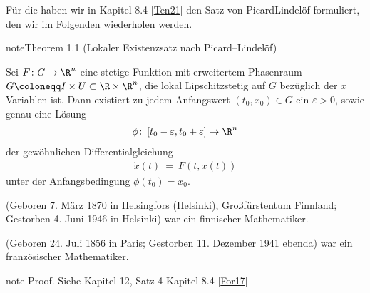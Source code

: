 \documentclass[letterpaper,10pt,english]{jupyterBook}
\begin{document}
\sphinxAtStartPar
Für die  haben wir in Kapitel 8.4 {[}\hyperlink{cite.references:id12}{Ten21}{]} den Satz von Picard\sphinxhyphen{}Lindelöf formuliert, den wir im Folgenden wiederholen werden.
\label{ode/repetition:thm:piclindlokal}
\begin{sphinxadmonition}{note}{Theorem 1.1 (Lokaler Existenzsatz nach Picard–Lindelöf)}



\sphinxAtStartPar
Sei \(F\colon G\to\R^n\) eine stetige Funktion mit erweitertem Phasenraum \(G \coloneqq I \times U \subset \R\times\R^n\), die lokal Lipschitz\sphinxhyphen{}stetig auf \(G\) bezüglich der \(x\)\sphinxhyphen{}Variablen ist.
Dann existiert zu jedem Anfangswert \((t_0,x_0) \in G\) ein \(\varepsilon>0\), sowie genau eine Lösung
\begin{equation*}
\begin{split}\phi \colon \left[t_0-\varepsilon, t_0+\varepsilon\right] \to \R^n\end{split}
\end{equation*}
\sphinxAtStartPar
der gewöhnlichen Differentialgleichung
\begin{equation*}
\begin{split}\dot{x}(t) \ = \ F(t,x(t))\end{split}
\end{equation*}
\sphinxAtStartPar
unter der Anfangsbedingung \(\phi(t_0)=x_0\).
\end{sphinxadmonition}

\begin{sphinxShadowBox}

\sphinxAtStartPar
{} (Geboren 7. März 1870 in Helsingfors (Helsinki), Großfürstentum Finnland; Gestorben 4. Juni 1946 in Helsinki) war ein finnischer Mathematiker.
\end{sphinxShadowBox}

\begin{sphinxShadowBox}

\sphinxAtStartPar
{} (Geboren 24. Juli 1856 in Paris; Gestorben 11. Dezember 1941 ebenda) war ein französischer Mathematiker.
\end{sphinxShadowBox}

\begin{sphinxadmonition}{note}
\sphinxAtStartPar
Proof. Siehe Kapitel 12, Satz 4 Kapitel 8.4 {[}\hyperlink{cite.references:id4}{For17}{]}
\end{sphinxadmonition}
\end{document}
